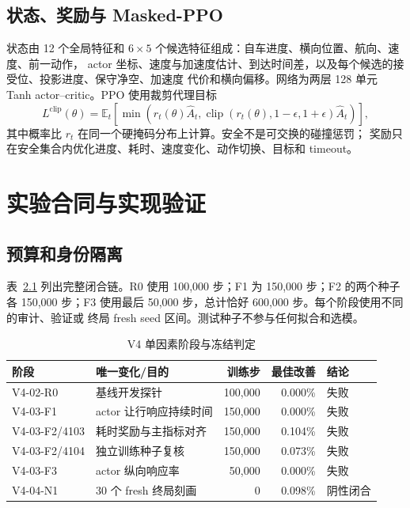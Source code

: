 \documentclass[12pt,a4paper,oneside]{report}
\newcommand{\fail}{\textcolor{vred}{失败}}
\begin{document}
\section{状态、奖励与 Masked-PPO}
状态由 12 个全局特征和 $6\times5$ 个候选特征组成：自车进度、横向位置、航向、速度、前一动作，
actor 坐标、速度与加速度估计、到达时间差，以及每个候选的接受位、投影进度、保守净空、加速度
代价和横向偏移。网络为两层 128 单元 Tanh actor--critic。PPO 使用裁剪代理目标
\begin{equation}
L^{\mathrm{clip}}(\theta)=\mathbb{E}_t\left[
\min\left(r_t(\theta)\hat A_t,
\operatorname{clip}(r_t(\theta),1-\epsilon,1+\epsilon)\hat A_t\right)\right],
\end{equation}
其中概率比 $r_t$ 在同一个硬掩码分布上计算\cite{schulman2017ppo}。安全不是可交换的碰撞惩罚；
奖励只在安全集合内优化进度、耗时、速度变化、动作切换、目标和 timeout。

\chapter{实验合同与实现验证}
\section{预算和身份隔离}
表~\ref{tab:stages} 列出完整闭合链。R0 使用 100,000 步；F1 为 150,000 步；F2 的两个种子各
150,000 步；F3 使用最后 50,000 步，总计恰好 600,000 步。每个阶段使用不同的审计、验证或
终局 fresh seed 区间。测试种子不参与任何拟合和选模。

\begin{table}[htbp]
\centering
\caption{V4 单因素阶段与冻结判定}
\label{tab:stages}
\begin{tabularx}{\textwidth}{p{2.5cm}Xrrp{2.2cm}}
\toprule
阶段 & 唯一变化/目的 & 训练步 & 最佳改善 & 结论\\
\midrule
V4-02-R0 & 基线开发探针 & 100,000 & 0.000\% & \fail\\
V4-03-F1 & actor 让行响应持续时间 & 150,000 & 0.000\% & \fail\\
V4-03-F2/4103 & 耗时奖励与主指标对齐 & 150,000 & 0.104\% & \fail\\
V4-03-F2/4104 & 独立训练种子复核 & 150,000 & 0.073\% & \fail\\
V4-03-F3 & actor 纵向响应率 & 50,000 & 0.000\% & \fail\\
V4-04-N1 & 30 个 fresh 终局刻画 & 0 & 0.098\% & 阴性闭合\\
\bottomrule
\end{tabularx}
\end{table}
\end{document}
